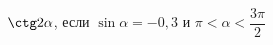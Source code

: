 \begin{ex}[type=simplify_calculate]
	\begin{condition}
		\( \ctg2\alpha \), \quad если \( \sin\alpha=-0,3 \) и \( \pi<\alpha<\dfrac{3\pi}{2} \)
	\end{condition}
\end{ex}